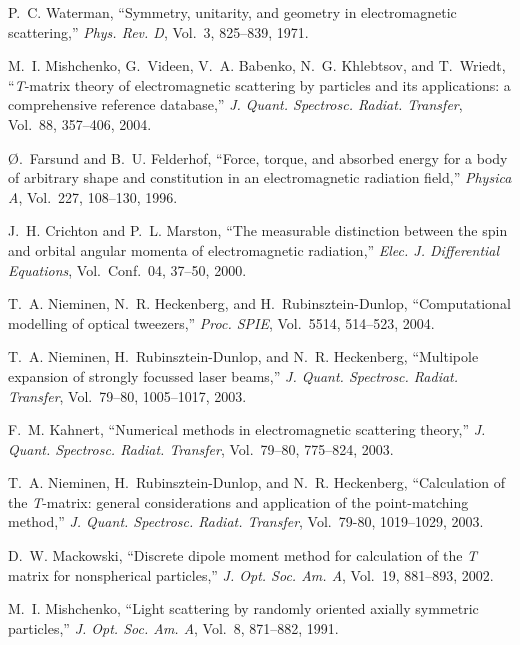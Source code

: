 \begin{thebibliography}{99}

P.~C. Waterman, ``Symmetry, unitarity, and geometry in electromagnetic
  scattering,'' {\em Phys. Rev. D}, Vol.~3, 825--839, 1971.

M.~I. Mishchenko, G.~Videen, V.~A. Babenko, N.~G. Khlebtsov, and T.~Wriedt,
  ``{\textit{T}}-matrix theory of electromagnetic scattering by particles and
  its applications: a comprehensive reference database,'' {\em J. Quant.
  Spectrosc. Radiat. Transfer}, Vol.~88, 357--406, 2004.

{\O}.~Farsund and B.~U. Felderhof, ``Force, torque, and absorbed energy for a
  body of arbitrary shape and constitution in an electromagnetic radiation
  field,'' {\em Physica A}, Vol.~227, 108--130, 1996.

J.~H. Crichton and P.~L. Marston, ``The measurable distinction between the spin
  and orbital angular momenta of electromagnetic radiation,'' {\em Elec.
  J. Differential Equations}, Vol.~Conf.~04, 37--50, 2000.

T.~A. Nieminen, N.~R. Heckenberg, and H.~Rubinsztein-Dunlop, ``Computational
  modelling of optical tweezers,'' {\em Proc. SPIE}, Vol.~5514, 514--523,
  2004.

T.~A. Nieminen, H.~Rubinsztein-Dunlop, and N.~R. Heckenberg, ``Multipole
  expansion of strongly focussed laser beams,'' {\em J. Quant. Spectrosc.
  Radiat. Transfer}, Vol.~79--80, 1005--1017, 2003.

F.~M. Kahnert, ``Numerical methods in electromagnetic scattering theory,'' {\em
  J. Quant. Spectrosc. Radiat. Transfer}, Vol.~79--80, 775--824, 2003.

T.~A. Nieminen, H.~Rubinsztein-Dunlop, and N.~R. Heckenberg, ``Calculation of
  the {\textit{T}}-matrix: general considerations and application of the
  point-matching method,'' {\em J. Quant. Spectrosc. Radiat. Transfer},
  Vol.~79-80, 1019--1029, 2003.

D.~W. Mackowski, ``Discrete dipole moment method for calculation of the
  {\textit{T}} matrix for nonspherical particles,'' {\em J. Opt. Soc. Am. A},
  Vol.~19, 881--893, 2002.

M.~I. Mishchenko, ``Light scattering by randomly oriented axially symmetric
  particles,'' {\em J. Opt. Soc. Am. A}, Vol.~8,
  871--882, 1991.


\end{thebibliography}
